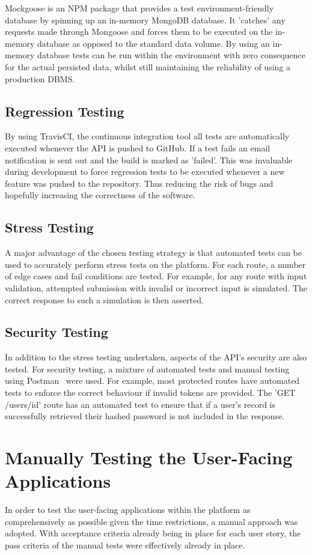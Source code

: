Mockgoose is an NPM package that provides a test environment-friendly database by spinning up an in-memory MongoDB database. It 'catches' any requests made through Mongoose and forces them to be executed on the in-memory database as opposed to the standard data volume. By using an in-memory database tests can be run within the environment with zero consequence for the actual persisted data, whilst still maintaining the reliability of using a production DBMS.

\subsection{Regression Testing}
By using  TravisCI, the continuous integration tool all tests are automatically executed whenever the API is pushed to GitHub. If a test fails an email notification is sent out and the build is marked as 'failed'. This was invaluable during development to force regression tests to be executed whenever a new feature was pushed to the repository. Thus reducing the risk of bugs and hopefully increasing the correctness of the software.

\subsection{Stress Testing}
A major advantage of the chosen testing strategy is that automated tests can be used to accurately perform stress tests on the platform. For each route, a number of edge cases and fail conditions are tested. For example, for any route with input validation, attempted submission with invalid or incorrect input is simulated. The correct response to such a simulation is then asserted.

\subsection{Security Testing}
In addition to the stress testing undertaken, aspects of the API's security are also tested. For security testing, a mixture of automated tests and manual testing using Postman~\cite{postman_documentation_ref} were used. For example, most protected routes have automated tests to enforce the correct behaviour if invalid tokens are provided. The 'GET /users/{id}' route has an automated test to ensure that if a user's record is successfully retrieved their hashed password is not included in the response.

\section{Manually Testing the User-Facing Applications}
In order to test the user-facing applications within the platform as comprehensively as possible given the time restrictions, a manual approach was adopted. With acceptance criteria already being in place for each user story, the pass criteria of the manual tests were effectively already in place. 

